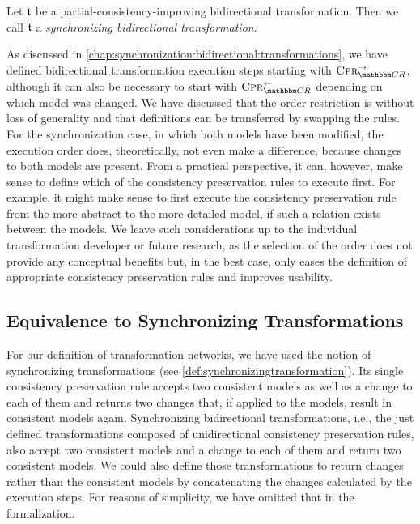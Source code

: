 \begin{definition}
    Let $\transformation{t}$ be a partial-consistency-improving bidirectional transformation.
    Then we call $\transformation{t}$ a \emph{synchronizing bidirectional transformation}.
\end{definition}

As discussed in \autoref{chap:synchronization:bidirectional:transformations}, we have defined bidirectional transformation execution steps starting with $\consistencypreservationrule{\consistencyrelationset{CR}}^{\rightarrow}$, although it can also be necessary to start with $\consistencypreservationrule{\consistencyrelationset{CR}}^{\leftarrow}$ depending on which model was changed.
We have discussed that the order restriction is without loss of generality and that definitions can be transferred by swapping the rules.
For the synchronization case, in which both models have been modified, the execution order does, theoretically, not even make a difference, because changes to both models are present.
From a practical perspective, it can, however, make sense to define which of the consistency preservation rules to execute first.
For example, it might make sense to first execute the consistency preservation rule from the more abstract to the more detailed model, if such a relation exists between the models.
We leave such considerations up to the individual transformation developer or future research, as the selection of the order does not provide any conceptual benefits but, in the best case, only eases the definition of appropriate consistency preservation rules and improves usability.


\subsection{Equivalence to Synchronizing Transformations}

For our definition of transformation networks, we have used the notion of synchronizing transformations (see \autoref{def:synchronizingtransformation}).
Its single consistency preservation rule accepts two consistent models as well as a change to each of them and returns two changes that, if applied to the models, result in consistent models again.
Synchronizing bidirectional transformations, i.e., the just defined transformations composed of unidirectional consistency preservation rules, also accept two consistent models and a change to each of them and return two consistent models.
We could also define those transformations to return changes rather than the consistent models by concatenating the changes calculated by the execution steps.
For reasons of simplicity, we have omitted that in the formalization.

